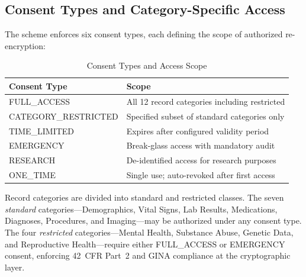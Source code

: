 \documentclass[conference,10pt]{IEEEtran}
\begin{document}
\subsection{Consent Types and Category-Specific Access}

The scheme enforces six consent types, each defining the scope of authorized re-encryption:

\begin{table}[htbp]
\centering
\caption{Consent Types and Access Scope}
\label{tab:consent}
\begin{tabular}{@{}p{2.2cm}p{5.5cm}@{}}
\toprule
\textbf{Consent Type} & \textbf{Scope} \\
\midrule
FULL\_ACCESS & All 12 record categories including restricted \\
CATEGORY\_RESTRICTED & Specified subset of standard categories only \\
TIME\_LIMITED & Expires after configured validity period \\
EMERGENCY & Break-glass access with mandatory audit \\
RESEARCH & De-identified access for research purposes \\
ONE\_TIME & Single use; auto-revoked after first access \\
\bottomrule
\end{tabular}
\end{table}

Record categories are divided into standard and restricted classes. The seven \emph{standard} categories---Demographics, Vital Signs, Lab Results, Medications, Diagnoses, Procedures, and Imaging---may be authorized under any consent type. The four \emph{restricted} categories---Mental Health, Substance Abuse, Genetic Data, and Reproductive Health---require either FULL\_ACCESS or EMERGENCY consent, enforcing 42~CFR Part~2 and GINA compliance at the cryptographic layer.
\end{document}
